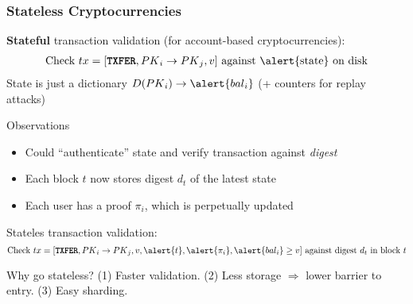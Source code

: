 \begin{frame}
    \frametitle{Stateless Cryptocurrencies}
    \footnotesize
    \pause
    \textbf{Stateful} transaction validation (for account-based cryptocurrencies)\pause:
    \begin{align*}
    \text{Check}\ \tx=[\txfer, \PK_i \rightarrow \PK_j, v]\ \text{against \alert{state} on disk}
    \end{align*}
    \pause
    State is just a dictionary $D(\PK_i)\rightarrow \alert{\bal_i}$ (+ counters for replay attacks)\pause
    \begin{alertblock}{Observations}
        \begin{itemize}
        \item Could ``authenticate'' state and verify transaction against \textit{digest}~\cite{Miller12,Todd16,Buterin17,RMCI17}\pause
        \item Each block $t$ now stores digest \alert{$d_t$} of the latest state\pause
        \item Each user has a proof \alert{$\pi_i$}, which is perpetually updated\pause
        \end{itemize}
    \end{alertblock}

    \alert{Stateles} transaction validation\pause:
    \begin{equation*}
    \text{Check}\ \tx=[\txfer, \PK_i \rightarrow \PK_j, v, \alert{t}, \alert{\pi_i}, \alert{\bal_i} \ge v]\ \text{against digest}\ d_t\ \text{in block}\ t
    \end{equation*}
    \pause
    \begin{exampleblock}{Why go stateless?}
        \pause
        (1) Faster validation.\pause\xspace
        (2) Less storage $\Rightarrow$ lower barrier to entry.\pause\xspace
        (3) Easy sharding.
    \end{exampleblock}
\end{frame}

